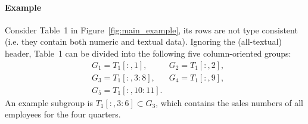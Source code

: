 \documentclass{sig-alternate-05-2015}
\newcommand{\range}[3]{\ensuremath{#1[#2,#3]}}
\newcommand{\rangeto}[2]{#1{:}#2}
\newcommand{\rangeall}{:}
\begin{document}

\paragraph{Example}
Consider Table~1 in Figure~\ref{fig:main_example}, its rows are not type consistent (i.e. they contain both numeric and textual data).
Ignoring the (all-textual) header, Table~1 can be divided into the following five column-oriented groups:
{\small
\begin{align*}
&G_1 = \range{T_1}{\rangeall}{1},
&G_2 = \range{T_1}{\rangeall}{2},\\
&G_3 = \range{T_1}{\rangeall}{\rangeto{3}{8}},
&G_4 = \range{T_1}{\rangeall}{9},\\
&G_5 = \range{T_1}{\rangeall}{\rangeto{10}{11}}.
\end{align*}
}
An example subgroup is $\range{T_1}{\rangeall}{\rangeto{3}{6}} \subset G_3$, which contains the sales numbers of all employees for the four quarters.
\end{document}
